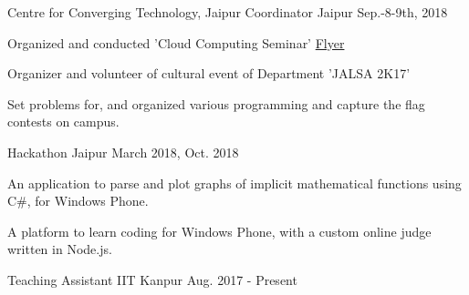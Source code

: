 \vspace{-0.3cm}


\begin{cventries}

  \extraentry
  {Centre for Converging Technology, Jaipur}
  {Coordinator}
  {Jaipur}
  {Sep.-8-9th, 2018}
  {
    \begin{cvitems}
    \item Organized and conducted 'Cloud Computing Seminar' \href{https://drive.google.com/file/d/1PDJYCQRCsk0e_HojYzUzvAWycQPXnXpg/view?usp=sharing}{Flyer}
    \item Organizer and volunteer of cultural event of Department 'JALSA 2K17'
    \item Set problems for, and organized various programming and capture the flag
      contests on campus.
    \end{cvitems}
  }


  {Hackathon}
  {Jaipur}
  {March 2018, Oct. 2018}
  {
    \begin{cvitems}
    \item An application to parse and plot graphs of implicit
      mathematical functions using C\#, for Windows Phone.
    \item A platform to learn coding for Windows Phone, with a
      custom online judge written in Node.js.
    \end{cvitems}
  }

  {Teaching Assistant}
  {IIT Kanpur}
  {Aug. 2017 - Present}
  {
  }
  \vspace{-0.3cm}


\end{cventries}

